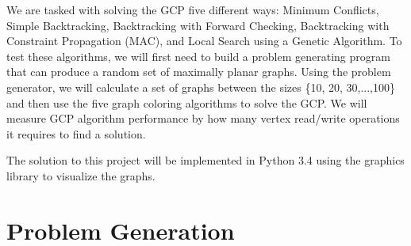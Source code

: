 \documentclass{article}
\begin{document}
\begin{multicols}{2}
We are tasked with solving the GCP five different ways: Minimum Conflicts, Simple Backtracking, Backtracking with Forward Checking, Backtracking with Constraint Propagation (MAC), and Local Search using a Genetic Algorithm. To test these algorithms, we will first need to build a problem generating program that can produce a random set of maximally planar graphs. Using the problem generator, we will calculate a set of graphs between the sizes \{10, 20, 30,...,100\} and then use the five graph coloring algorithms to solve the GCP. We will measure GCP algorithm performance by how many vertex read/write operations it requires to find a solution.  \par The solution to this project will be implemented in Python 3.4 using the graphics library to visualize the graphs.
\section{Problem Generation}

\end{multicols}
\end{document}
